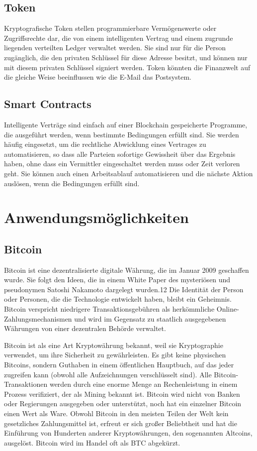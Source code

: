 \subsection{Token}
Kryptografische Token stellen programmierbare Vermögenswerte oder Zugriffsrechte dar, die von einem intelligenten Vertrag und einem zugrunde liegenden verteilten Ledger verwaltet werden. Sie sind nur für die Person zugänglich, die den privaten Schlüssel für diese Adresse besitzt, und können nur mit diesem privaten Schlüssel signiert werden. Token könnten die Finanzwelt auf die gleiche Weise beeinflussen wie die E-Mail das Postsystem.
\subsection{Smart Contracts}
Intelligente Verträge sind einfach auf einer Blockchain gespeicherte Programme, die ausgeführt werden, wenn bestimmte Bedingungen erfüllt sind. Sie werden häufig eingesetzt, um die rechtliche Abwicklung eines Vertrages zu automatisieren, so dass alle Parteien sofortige Gewissheit über das Ergebnis haben, ohne dass ein Vermittler eingeschaltet werden muss oder Zeit verloren geht. Sie können auch einen Arbeitsablauf automatisieren und die nächste Aktion auslösen, wenn die Bedingungen erfüllt sind.

\section{Anwendungsmöglichkeiten}
\subsection{Bitcoin}
Bitcoin ist eine dezentralisierte digitale Währung, die im Januar 2009 geschaffen wurde. Sie folgt den Ideen, die in einem White Paper des mysteriösen und pseudonymen Satoshi Nakamoto dargelegt wurden.12 Die Identität der Person oder Personen, die die Technologie entwickelt haben, bleibt ein Geheimnis. Bitcoin verspricht niedrigere Transaktionsgebühren als herkömmliche Online-Zahlungsmechanismen und wird im Gegensatz zu staatlich ausgegebenen Währungen von einer dezentralen Behörde verwaltet.


Bitcoin ist als eine Art Kryptowährung bekannt, weil sie Kryptographie verwendet, um ihre Sicherheit zu gewährleisten. Es gibt keine physischen Bitcoins, sondern Guthaben in einem öffentlichen Hauptbuch, auf das jeder zugreifen kann (obwohl alle Aufzeichnungen verschlüsselt sind). Alle Bitcoin-Transaktionen werden durch eine enorme Menge an Rechenleistung in einem Prozess verifiziert, der als Mining bekannt ist. Bitcoin wird nicht von Banken oder Regierungen ausgegeben oder unterstützt, noch hat ein einzelner Bitcoin einen Wert als Ware. Obwohl Bitcoin in den meisten Teilen der Welt kein gesetzliches Zahlungsmittel ist, erfreut er sich großer Beliebtheit und hat die Einführung von Hunderten anderer Kryptowährungen, den sogenannten Altcoins, ausgelöst. Bitcoin wird im Handel oft als BTC abgekürzt.
